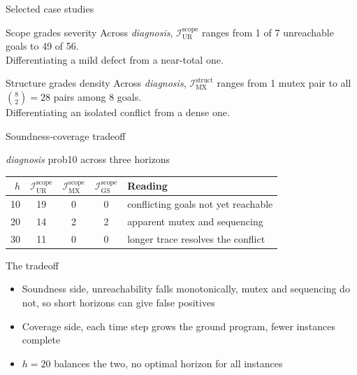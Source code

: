 \begin{frame}{Selected case studies}
    \begin{exampleblock}{Scope grades severity}
        Across \textit{diagnosis}, $\mathcal{I}^{\text{scope}}_{\text{UR}}$ ranges from 1 of 7 unreachable goals to 49 of 56. \\
        Differentiating a mild defect from a near-total one.
    \end{exampleblock}

    \begin{exampleblock}{Structure grades density}
        Across \textit{diagnosis}, $\mathcal{I}^{\text{struct}}_{\text{MX}}$ ranges from 1 mutex pair to all $\binom{8}{2} = 28$ pairs among 8 goals. \\
        Differentiating an isolated conflict from a dense one.
    \end{exampleblock}

\end{frame}

\begin{frame}{Soundness-coverage tradeoff}
    \begin{exampleblock}{\textit{diagnosis} prob10 across three horizons}
        \centering\footnotesize
        \begin{tabular}{rccc l}
            \toprule
            $h$ & $\mathcal{I}^{\text{scope}}_{\text{UR}}$ & $\mathcal{I}^{\text{scope}}_{\text{MX}}$ & $\mathcal{I}^{\text{scope}}_{\text{GS}}$ & Reading                             \\
            \midrule
            10  & 19                                       & 0                                        & 0                                        & conflicting goals not yet reachable \\
            20  & 14                                       & 2                                        & 2                                        & apparent mutex and sequencing       \\
            30  & 11                                       & 0                                        & 0                                        & longer trace resolves the conflict  \\
            \bottomrule
        \end{tabular}
    \end{exampleblock}

    \begin{block}{The tradeoff}
        \begin{itemize}
            \item Soundness side, unreachability falls monotonically, mutex and sequencing do not, so short horizons can give false positives
            \item Coverage side, each time step grows the ground program, fewer instances complete
            \item $h = 20$ balances the two, no optimal horizon for all instances
        \end{itemize}
    \end{block}

\end{frame}
